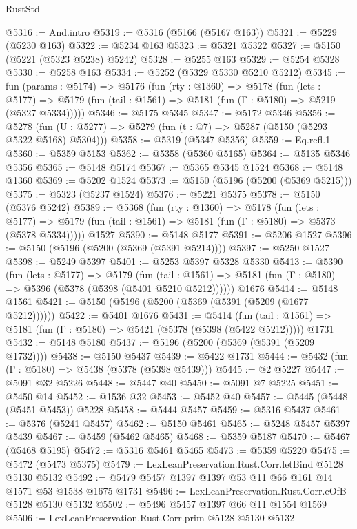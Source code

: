 \begin{lexlean}{RustStd}
\begin{coremodule}
{\begin{coremodule}
{{{{{{{{{{{{{{{{{{{{{{{{{{{{{{{{@5316 := And.intro
@5319 := @5316 (@5166 (@5167 @163))
@5321 := @5229 (@5230 @163)
@5322 := @5234 @163
@5323 := @5321 @5322
@5327 := @5150 (@5221 (@5323 @5238) @5242)
@5328 := @5255 @163
@5329 := @5254 @5328
@5330 := @5258 @163
@5334 := @5252 (@5329 @5330 @5210 @5212)
@5345 := fun (params : @5174) =>
  @5176
    (fun (rty : @1360) =>
    @5178
      (fun (lets : @5177) =>
      @5179 (fun (tail : @1561) => @5181 (fun (Γ : @5180) => @5219 (@5327 @5334)))))
@5346 := @5175 @5345
@5347 := @5172 @5346
@5356 := @5278 (fun (U : @5277) => @5279 (fun (t : @7) => @5287 (@5150 (@5293 @5322 @5168) @5304)))
@5358 := @5319 (@5347 @5356)
@5359 := Eq.refl.{1}
@5360 := @5359 @5153
@5362 := @5358 (@5360 @5165)
@5364 := @5135 @5346 @5356
@5365 := @5148 @5174
@5367 := @5365 @5345 @1524
@5368 := @5148 @1360
@5369 := @5202 @1524
@5373 := @5150 (@5196 (@5200 (@5369 @5215)))
@5375 := @5323 (@5237 @1524)
@5376 := @5221 @5375
@5378 := @5150 (@5376 @5242)
@5389 := @5368
    (fun (rty : @1360) =>
    @5178
      (fun (lets : @5177) =>
      @5179 (fun (tail : @1561) => @5181 (fun (Γ : @5180) => @5373 (@5378 @5334)))))
    @1527
@5390 := @5148 @5177
@5391 := @5206 @1527
@5396 := @5150 (@5196 (@5200 (@5369 (@5391 @5214))))
@5397 := @5250 @1527
@5398 := @5249 @5397
@5401 := @5253 @5397 @5328 @5330
@5413 := @5390
    (fun (lets : @5177) =>
    @5179
      (fun (tail : @1561) => @5181 (fun (Γ : @5180) => @5396 (@5378 (@5398 (@5401 @5210 @5212))))))
    @1676
@5414 := @5148 @1561
@5421 := @5150 (@5196 (@5200 (@5369 (@5391 (@5209 (@1677 @5212))))))
@5422 := @5401 @1676
@5431 := @5414
    (fun (tail : @1561) => @5181 (fun (Γ : @5180) => @5421 (@5378 (@5398 (@5422 @5212)))))
    @1731
@5432 := @5148 @5180
@5437 := @5196 (@5200 (@5369 (@5391 (@5209 @1732))))
@5438 := @5150 @5437
@5439 := @5422 @1731
@5444 := @5432 (fun (Γ : @5180) => @5438 (@5378 (@5398 @5439)))
@5445 := @2 @5227
@5447 := @5091 @32 @5226
@5448 := @5447 @40
@5450 := @5091 @7 @5225
@5451 := @5450 @14
@5452 := @1536 @32
@5453 := @5452 @40
@5457 := @5445 (@5448 (@5451 @5453)) @5228
@5458 := @5444 @5457
@5459 := @5316 @5437
@5461 := @5376 (@5241 @5457)
@5462 := @5150 @5461
@5465 := @5248 @5457 @5397 @5439
@5467 := @5459 (@5462 @5465)
@5468 := @5359 @5187
@5470 := @5467 (@5468 @5195)
@5472 := @5316 @5461 @5465
@5473 := @5359 @5220
@5475 := @5472 (@5473 @5375)
@5479 := LexLeanPreservation.Rust.Corr.letBind @5128 @5130 @5132
@5492 := @5479 @5457 @1397 @1397 @53 @11 @66 @161 @14 @1571 @53 @1538 @1675 @1731
@5496 := LexLeanPreservation.Rust.Corr.eOfB @5128 @5130 @5132
@5502 := @5496 @5457 @1397 @66 @11 @1554 @1569
@5506 := LexLeanPreservation.Rust.Corr.prim @5128 @5130 @5132
}}}}}}}}}}}}}}}}}}}}}}}}}}}}}}}}
\end{coremodule}}
\end{coremodule}
\end{lexlean}
